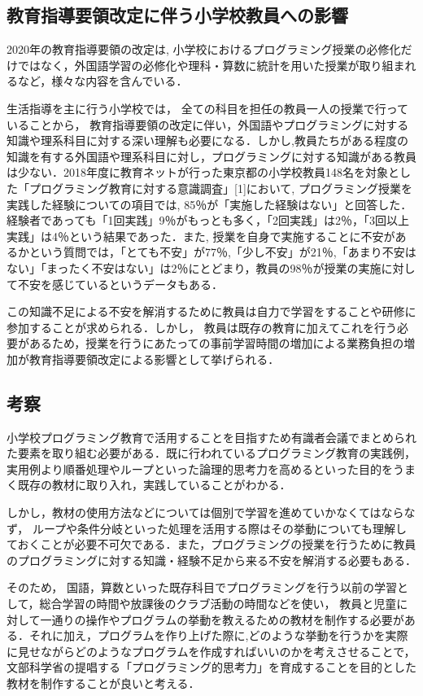 \subsection{教育指導要領改定に伴う小学校教員への影響}
2020年の教育指導要領の改定は, 小学校におけるプログラミング授業の必修化だけではなく，外国語学習の必修化や理科・算数に統計を用いた授業が取り組まれるなど，様々な内容を含んでいる．

生活指導を主に行う小学校では， 全ての科目を担任の教員一人の授業で行っていることから， 教育指導要領の改定に伴い，外国語やプログラミングに対する知識や理系科目に対する深い理解も必要になる．しかし,教員たちがある程度の知識を有する外国語や理系科目に対し，プログラミングに対する知識がある教員は少ない．2018年度に教育ネットが行った東京都の小学校教員148名を対象とした「プログラミング教育に対する意識調査」[1]において, プログラミング授業を実践した経験についての項目では, 85％が「実施した経験はない」と回答した．経験者であっても「1回実践」9％がもっとも多く，「2回実践」は2％，「3回以上実践」は4％という結果であった．また, 授業を自身で実施することに不安があるかという質問では，「とても不安」が77％,「少し不安」が21％,「あまり不安はない」「まったく不安はない」は2％にとどまり，教員の98％が授業の実施に対して不安を感じているというデータもある．

この知識不足による不安を解消するために教員は自力で学習をすることや研修に参加することが求められる．しかし， 教員は既存の教育に加えてこれを行う必要があるため，授業を行うにあたっての事前学習時間の増加による業務負担の増加が教育指導要領改定による影響として挙げられる．

\subsection{考察}
小学校プログラミング教育で活用することを目指すため有識者会議でまとめられた要素を取り組む必要がある．既に行われているプログラミング教育の実践例，実用例より順番処理やループといった論理的思考力を高めるといった目的をうまく既存の教材に取り入れ，実践していることがわかる．

しかし，教材の使用方法などについては個別で学習を進めていかなくてはならなず， ループや条件分岐といった処理を活用する際はその挙動についても理解しておくことが必要不可欠である．また，プログラミングの授業を行うために教員のプログラミングに対する知識・経験不足から来る不安を解消する必要もある．

そのため， 国語，算数といった既存科目でプログラミングを行う以前の学習として，総合学習の時間や放課後のクラブ活動の時間などを使い， 教員と児童に対して一通りの操作やプログラムの挙動を教えるための教材を制作する必要がある．それに加え，プログラムを作り上げた際に,どのような挙動を行うかを実際に見せながらどのようなプログラムを作成すればいいのかを考えさせることで，文部科学省の提唱する「プログラミング的思考力」を育成することを目的とした教材を制作することが良いと考える．




